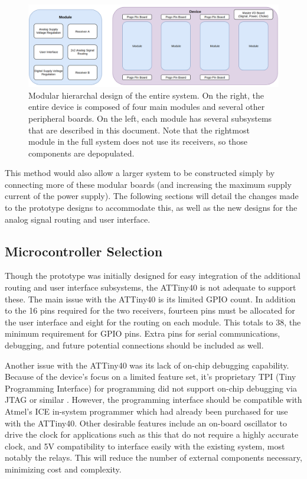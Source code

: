 \documentclass{article}
\begin{document}
	\begin{figure}
		\centering
		\includegraphics[width = \textwidth]{PR4Images/ModularHierarchy.png}
		\caption{Modular hierarchal design of the entire system.  On the right, the entire device is composed of four main modules and several other peripheral boards.  On the left, each module has several subsystems that are described in this document.  Note that the rightmost module in the full system does not use its receivers, so those components are depopulated.}
		\label{fig:systemhierarchy}
	\end{figure}

	This method would also allow a larger system to be constructed simply by connecting more of these modular boards (and increasing the maximum supply current of the power supply).  The following sections will detail the changes made to the prototype designs to accommodate this, as well as the new designs for the analog signal routing and user interface.

	\subsection{Microcontroller Selection}

	Though the prototype was initially designed for easy integration of the additional routing and user interface subsystems, the ATTiny40 is not adequate to support these.  The main issue with the ATTiny40 is its limited GPIO count.  In addition to the 16 pins required for the two receivers, fourteen pins must be allocated for the user interface and eight for the routing on each module.  This totals to 38, the minimum requirement for GPIO pins.  Extra pins for serial communications, debugging, and future potential connections should be included as well. 

	Another issue with the ATTiny40 was its lack of on-chip debugging capability.  Because of the device's focus on a limited feature set, it's proprietary TPI (Tiny Programming Interface) for programming did not support on-chip debugging via JTAG or similar \cite{ATTINY40datasheet}.  However, the programming interface should be compatible with Atmel's ICE in-system programmer which had already been purchased for use with the ATTiny40.  Other desirable features include an on-board oscillator to drive the clock for applications such as this that do not require a highly accurate clock, and 5V compatibility to interface easily with the existing system, most notably the relays.  This will reduce the number of external components necessary, minimizing cost and complexity.
\end{document}
